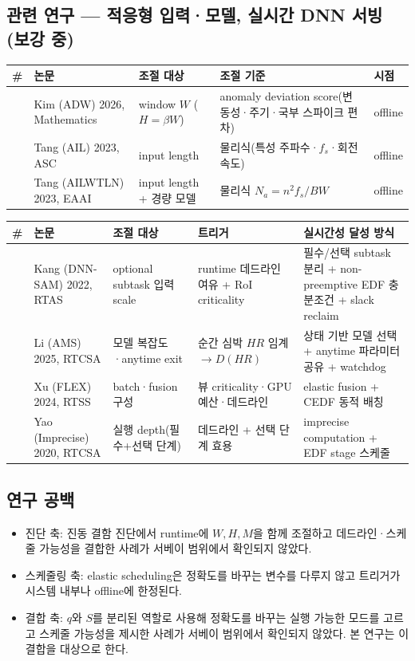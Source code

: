 \documentclass[10pt]{article}
\begin{document}
\subsection{관련 연구 --- 적응형 입력·모델, 실시간 DNN 서빙 (보강 중)}
\begin{center}\scriptsize
\begin{tabular}{@{}cL{2.6cm}L{2.6cm}L{4.4cm}L{1.6cm}@{}}
\toprule
\# & 논문 & 조절 대상 & 조절 기준 & 시점 \\ \midrule
[15] & Kim (ADW) 2026, Mathematics & window $W$ ($H=\beta W$) & anomaly deviation score(변동성·주기·국부 스파이크 편차) & offline \\
[16] & Tang (AIL) 2023, ASC & input length & 물리식(특성 주파수·$f_s$·회전속도) & offline \\
[17] & Tang (AILWTLN) 2023, EAAI & input length + 경량 모델 & 물리식 $N_a=n^2 f_s/BW$ & offline \\
\bottomrule
\end{tabular}
\end{center}
\begin{center}\scriptsize
\begin{tabular}{@{}cL{2.4cm}L{2.6cm}L{3.0cm}L{4.2cm}@{}}
\toprule
\# & 논문 & 조절 대상 & 트리거 & 실시간성 달성 방식 \\ \midrule
[18] & Kang (DNN-SAM) 2022, RTAS & optional subtask 입력 scale & runtime 데드라인 여유 + RoI criticality & 필수/선택 subtask 분리 + non-preemptive EDF 충분조건 + slack reclaim \\
[19] & Li (AMS) 2025, RTCSA & 모델 복잡도·anytime exit & 순간 심박 $HR$ 임계 $\rightarrow D(HR)$ & 상태 기반 모델 선택 + anytime 파라미터 공유 + watchdog \\
[20] & Xu (FLEX) 2024, RTSS & batch·fusion 구성 & 뷰 criticality·GPU 예산·데드라인 & elastic fusion + CEDF 동적 배칭 \\
[21] & Yao (Imprecise) 2020, RTCSA & 실행 depth(필수+선택 단계) & 데드라인 + 선택 단계 효용 & imprecise computation + EDF stage 스케줄 \\
\bottomrule
\end{tabular}
\end{center}

\subsection{연구 공백}
\begin{itemize}
\item 진단 축: 진동 결함 진단에서 runtime에 $W,H,M$을 함께 조절하고 데드라인·스케줄 가능성을 결합한 사례가 서베이 범위에서 확인되지 않았다.
\item 스케줄링 축: elastic scheduling은 정확도를 바꾸는 변수를 다루지 않고 트리거가 시스템 내부나 offline에 한정된다.
\item 결합 축: $q$와 $S$를 분리된 역할로 사용해 정확도를 바꾸는 실행 가능한 모드를 고르고 스케줄 가능성을 제시한 사례가 서베이 범위에서 확인되지 않았다. 본 연구는 이 결합을 대상으로 한다.
\end{itemize}
\end{document}
